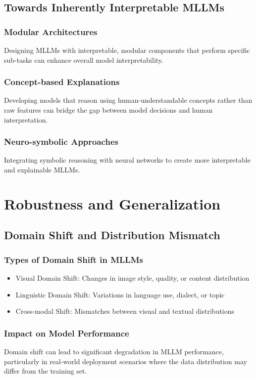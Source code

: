 \subsection{Towards Inherently Interpretable MLLMs}
\subsubsection{Modular Architectures}
Designing MLLMs with interpretable, modular components that perform specific sub-tasks can enhance overall model interpretability.

\subsubsection{Concept-based Explanations}
Developing models that reason using human-understandable concepts rather than raw features can bridge the gap between model decisions and human interpretation.

\subsubsection{Neuro-symbolic Approaches}
Integrating symbolic reasoning with neural networks to create more interpretable and explainable MLLMs.

\section{Robustness and Generalization}

\subsection{Domain Shift and Distribution Mismatch}
\subsubsection{Types of Domain Shift in MLLMs}
\begin{itemize}
    \item Visual Domain Shift: Changes in image style, quality, or content distribution
    \item Linguistic Domain Shift: Variations in language use, dialect, or topic
    \item Cross-modal Shift: Mismatches between visual and textual distributions
\end{itemize}

\subsubsection{Impact on Model Performance}
Domain shift can lead to significant degradation in MLLM performance, particularly in real-world deployment scenarios where the data distribution may differ from the training set.

